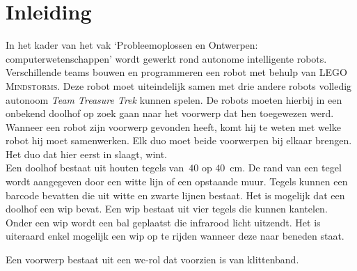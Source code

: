 \documentclass[eind]{penoverslag}
\begin{document}
\newpage
\setcounter{tocdepth}{3}
\tableofcontents
\newpage

\section{Inleiding} %
\label{ssec:Inl}
In het kader van het vak `Probleemoplossen en Ontwerpen: computerwetenschappen' wordt gewerkt rond autonome intelligente robots. Verschillende teams bouwen en programmeren een robot met behulp van \textsc{LEGO Mindstorms}. Deze robot moet uiteindelijk samen met drie andere robots volledig autonoom \textit{Team Treasure Trek} kunnen spelen.
De robots moeten hierbij in een onbekend doolhof op zoek gaan naar het voorwerp dat hen toegewezen werd. Wanneer een robot zijn voorwerp gevonden heeft, komt hij te weten met welke robot hij moet samenwerken. Elk duo moet beide voorwerpen bij elkaar brengen. Het duo dat hier eerst in slaagt, wint.\\

Een doolhof bestaat uit houten tegels van~$40$ op $40$~cm. De rand van een tegel wordt aangegeven door een witte lijn of een opstaande muur. Tegels kunnen een barcode bevatten die uit witte en zwarte lijnen bestaat. Het is mogelijk dat een doolhof een wip bevat. Een wip bestaat uit vier tegels die kunnen kantelen. Onder een wip wordt een bal geplaatst die infrarood licht uitzendt. Het is uiteraard enkel mogelijk een wip op te rijden wanneer deze naar beneden staat.

Een voorwerp bestaat uit een wc-rol dat voorzien is van klittenband.\\

%
%
\end{document}
